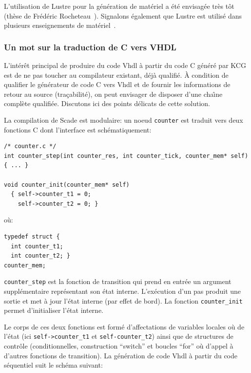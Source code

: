 \documentclass[a4paper]{article}
\newcommand{\lustre}{{\sc Lustre}}
\newcommand{\scade}{{\sc Scade}}
\newcommand{\vhdl}{{\sc Vhdl}}
\begin{document}
L'utilisation de Lustre pour la g\'en\'eration de mat\'eriel a \'et\'e envisag\'ee
tr\`es t\^ot (th\`ese de Fr\'ed\'eric Rocheteau~\cite{lustre:rocheteau91}). Signalons
\'egalement que \lustre{} est utilis\'e dans plusieurs enseignements de
mat\'eriel~\cite{lustre:amblard05}.

\subsubsection{Un mot sur la traduction de C vers VHDL}
L'int\'er\^et principal de produire du code \vhdl{} \`a partir du code C
g\'en\'er\'e par KCG est de ne pas toucher au compilateur existant, d\'ej\`a
qualifi\'e. \`A condition de qualifier le g\'en\'erateur de code C vers
\vhdl{} et de fournir les informations de retour au source
(tra\c{c}abilit\'e), on peut envisager de disposer d'une cha\^{\i}ne
compl\`ete qualifi\'ee. Discutons ici des points d\'elicats de cette solution.

La compilation de \scade{} est modulaire: un noeud \texttt{counter}
est traduit vers deux fonctions
C dont l'interface est sch\'ematiquement:

\begin{verbatim}
/* counter.c */
int counter_step(int counter_res, int counter_tick, counter_mem* self) { ... }

void counter_init(counter_mem* self)
  { self->counter_t1 = 0;
    self->counter_t2 = 0; }
\end{verbatim}
o\`u:
\begin{verbatim}
typedef struct { 
  int counter_t1; 
  int counter_t2; }
counter_mem;
\end{verbatim}
\texttt{counter\_step} est la fonction de transition qui prend
en entr\'ee un argument suppl\'ementaire repr\'esentant son \'etat interne. L'ex\'ecution
d'un pas produit une sortie et met \`a jour l'\'etat interne (par effet de bord).
La fonction \texttt{counter\_init} permet d'initialiser l'\'etat interne.

Le corps de ces deux fonctions est form\'e d'affectations de variables
locales o\`u de l'\'etat (ici \texttt{self->counter\_t1} et
\texttt{self-counter\_t2}) ainsi que de structures de contr\^ole
(conditionnelles, construction ``switch'' et boucles ``for'' o\`u
d'appel \`a d'autres fonctions de transition). La g\'en\'eration de code
\vhdl{} \`a partir du code s\'equentiel suit le sch\'ema suivant:
\end{document}
